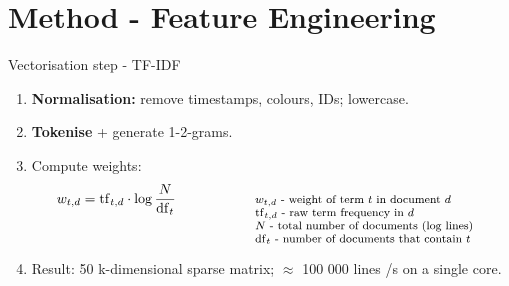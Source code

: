 \documentclass[14pt,aspectratio=169]{beamer}  %
\begin{document}
\section{Method - Feature Engineering}

\begin{frame}{Vectorisation step  - TF-IDF}
\small
\begin{enumerate}[<+->]
  \item \textbf{Normalisation:} remove timestamps, colours, IDs; lowercase.
  \item \textbf{Tokenise} + generate 1-2-grams.
  \item Compute weights:
        \begin{equation*}
            w_{t,d}= \mathrm{tf}_{t,d}\cdot
            \log\frac{N}{\mathrm{df}_t}
            \hspace*{2cm}
            \begin{minipage}[t]{0.48\linewidth}
                \footnotesize\raggedright
                $w_{t,d}$ - weight of term $t$ in document $d$\\
                $\mathrm{tf}_{t,d}$ - raw term frequency in $d$\\
                $N$ - total number of documents (log lines)\\
                $\mathrm{df}_t$ - number of documents that contain $t$
            \end{minipage}
            \end{equation*}
  \item Result: 50 k-dimensional sparse matrix;  
        $\approx$ 100 000 lines /s on a single core.
\end{enumerate}

\vspace{0.4em}
\centering
{}
\end{frame}

\end{document}
